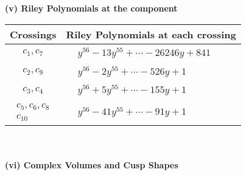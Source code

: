 \documentclass[1p]{elsarticle_modified}
\theoremstyle{definition}
\begin{document}
\newpage\renewcommand{\arraystretch}{1}
\flushleft \textbf{(v) Riley Polynomials at the component}\newline \\
\begin{tabular}{m{50pt}|m{274pt}}
Crossings & \hspace{64pt}Riley Polynomials at each crossing \\
\hline $$\begin{aligned}c_{1},c_{7}\end{aligned}$$&$\begin{aligned}
&y^{56}-13 y^{55}+\cdots-26246 y+841
\end{aligned}$\\
\hline $$\begin{aligned}c_{2},c_{9}\end{aligned}$$&$\begin{aligned}
&y^{56}-2 y^{55}+\cdots-526 y+1
\end{aligned}$\\
\hline $$\begin{aligned}c_{3},c_{4}\end{aligned}$$&$\begin{aligned}
&y^{56}+5 y^{55}+\cdots-155 y+1
\end{aligned}$\\
\hline $$\begin{aligned}c_{5},c_{6},c_{8}\\c_{10}\end{aligned}$$&$\begin{aligned}
&y^{56}-41 y^{55}+\cdots-91 y+1
\end{aligned}$\\
\hline
\end{tabular}\\~\\
\newpage\flushleft \textbf{(vi) Complex Volumes and Cusp Shapes}
\end{document}
